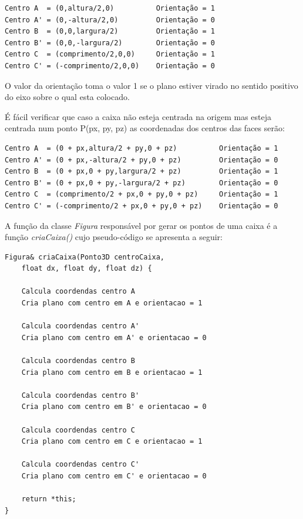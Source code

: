 \begin{Verbatim}
Centro A  = (0,altura/2,0)          Orientação = 1
Centro A' = (0,-altura/2,0)         Orientação = 0
Centro B  = (0,0,largura/2)         Orientação = 1
Centro B' = (0,0,-largura/2)        Orientação = 0
Centro C  = (comprimento/2,0,0)     Orientação = 1
Centro C' = (-comprimento/2,0,0)    Orientação = 0
\end{Verbatim}

O valor da orientação toma o valor 1 se o plano estiver virado no sentido positivo do eixo sobre o qual esta colocado.

É fácil verificar que caso a caixa não esteja centrada na origem mas esteja centrada num ponto P(px, py, pz) as coordenadas dos centros das faces serão:

\begin{Verbatim}
Centro A  = (0 + px,altura/2 + py,0 + pz)          Orientação = 1
Centro A' = (0 + px,-altura/2 + py,0 + pz)         Orientação = 0
Centro B  = (0 + px,0 + py,largura/2 + pz)         Orientação = 1
Centro B' = (0 + px,0 + py,-largura/2 + pz)        Orientação = 0
Centro C  = (comprimento/2 + px,0 + py,0 + pz)     Orientação = 1
Centro C' = (-comprimento/2 + px,0 + py,0 + pz)    Orientação = 0
\end{Verbatim}

A função da classe \textit{Figura} responsável por gerar os pontos de uma caixa é a função \textit{criaCaixa()} cujo pseudo-código se apresenta a seguir:

\begin{Verbatim}
Figura& criaCaixa(Ponto3D centroCaixa, 
	float dx, float dy, float dz) {
	
	Calcula coordendas centro A
	Cria plano com centro em A e orientacao = 1
	
	Calcula coordendas centro A'
	Cria plano com centro em A' e orientacao = 0
	
	Calcula coordendas centro B
	Cria plano com centro em B e orientacao = 1
	
	Calcula coordendas centro B'
	Cria plano com centro em B' e orientacao = 0
	
	Calcula coordendas centro C
	Cria plano com centro em C e orientacao = 1
	
	Calcula coordendas centro C'
	Cria plano com centro em C' e orientacao = 0
	
	return *this;
}

\end{Verbatim}


